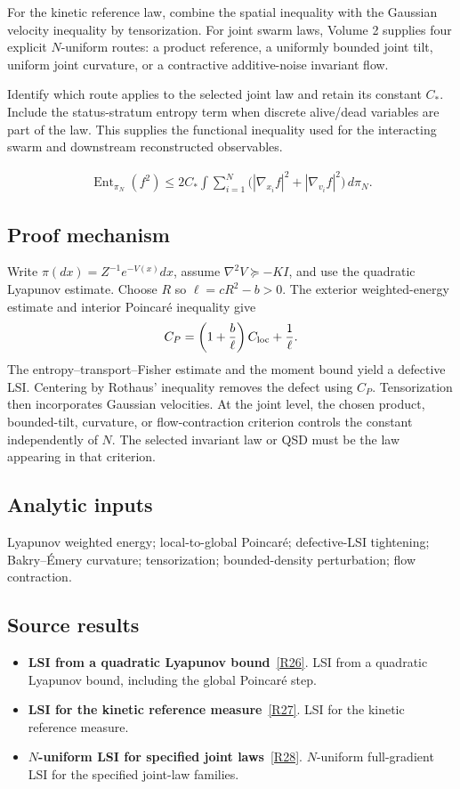 \documentclass[11pt,a4paper]{article}
\begin{document}
For the kinetic reference law, combine the spatial inequality with the Gaussian velocity inequality by tensorization. For joint swarm laws, Volume 2 supplies four explicit \(N\)-uniform routes: a product reference, a uniformly bounded joint tilt, uniform joint curvature, or a contractive additive-noise invariant flow.

Identify which route applies to the selected joint law and retain its constant \(C_*\). Include the status-stratum entropy term when discrete alive/dead variables are part of the law. This supplies the functional inequality used for the interacting swarm and downstream reconstructed observables.


\begin{gather*}
\operatorname{Ent}_{\pi_N}(f^2)\le 2C_*\int\sum_{i=1}^N
\bigl(|\nabla_{x_i}f|^2+|\nabla_{v_i}f|^2\bigr)\,d\pi_N.
\end{gather*}
\subsection*{Proof mechanism}
Write \(\pi(dx)=Z^{-1}e^{-V(x)}dx\), assume \(\nabla^2V\succeq-KI\), and use the quadratic Lyapunov estimate. Choose \(R\) so \(\ell=cR^2-b>0\). The exterior weighted-energy estimate and interior Poincar\'e inequality give
\[C_P=\left(1+\frac b\ell\right)C_{\rm loc}+\frac1\ell.\]
The entropy--transport--Fisher estimate and the moment bound yield a defective LSI. Centering by Rothaus' inequality removes the defect using \(C_P\). Tensorization then incorporates Gaussian velocities. At the joint level, the chosen product, bounded-tilt, curvature, or flow-contraction criterion controls the constant independently of \(N\). The selected invariant law or QSD must be the law appearing in that criterion.
\subsection*{Analytic inputs}
Lyapunov weighted energy; local-to-global Poincar\'e; defective-LSI tightening; Bakry--\'Emery curvature; tensorization; bounded-density perturbation; flow contraction.
\subsection*{Source results}
\begin{itemize}
\item \textbf{LSI from a quadratic Lyapunov bound}~\hyperref[src:thm-unconditional-lsi]{[R26]}. LSI from a quadratic Lyapunov bound, including the global Poincar\'e step.
\item \textbf{LSI for the kinetic reference measure}~\hyperref[src:thm-kinetic-lsi]{[R27]}. LSI for the kinetic reference measure.
\item \textbf{\(N\)-uniform LSI for specified joint laws}~\hyperref[src:cor-n-uniform-lsi]{[R28]}. \(N\)-uniform full-gradient LSI for the specified joint-law families.
\end{itemize}
\end{document}
